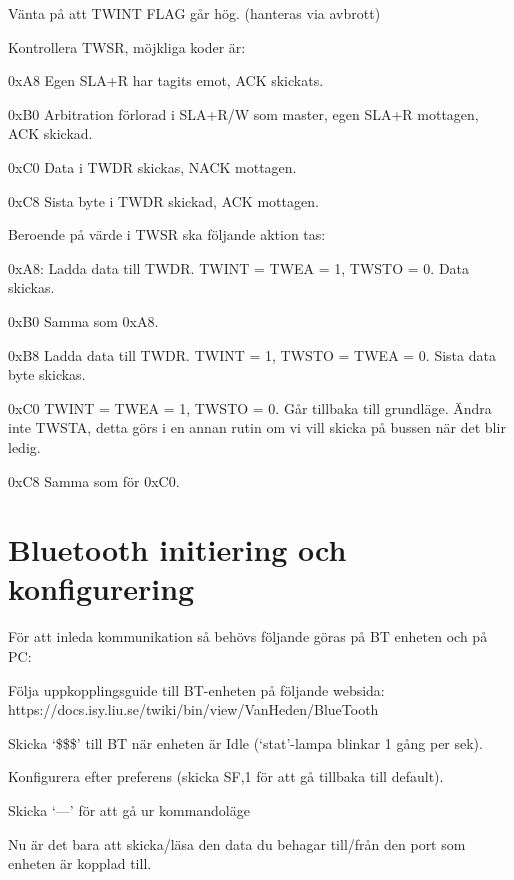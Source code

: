 \begin{packed_enumerate}
\item Vänta på att TWINT FLAG går hög. (hanteras via avbrott)
\item Kontrollera TWSR, möjkliga koder är:
\begin{packed_enumerate}
\item 0xA8 Egen SLA+R har tagits emot, ACK skickats.
\item 0xB0 Arbitration förlorad i SLA+R/W som master, egen SLA+R mottagen, ACK skickad.
\item 0xC0 Data i TWDR skickas, NACK mottagen.
\item 0xC8 Sista byte i TWDR skickad, ACK mottagen.
\end{packed_enumerate}
\item Beroende på värde i TWSR ska följande aktion tas:
\begin{packed_enumerate}
\item 0xA8: Ladda data till TWDR. TWINT = TWEA = 1, TWSTO = 0. Data skickas.
\item 0xB0 Samma som 0xA8.
\item 0xB8 Ladda data till TWDR. TWINT = 1, TWSTO = TWEA = 0. Sista data byte skickas.
\item 0xC0 TWINT = TWEA = 1, TWSTO = 0. Går tillbaka till grundläge. Ändra inte TWSTA, detta görs i en annan rutin om vi vill skicka på bussen när det blir ledig.
\item 0xC8 Samma som för 0xC0.
\end{packed_enumerate}
\end{packed_enumerate}


\section{Bluetooth initiering och konfigurering}
\label{Bluetoothinit}

För att inleda kommunikation så behövs följande göras på BT enheten och på PC:

\begin{packed_enumerate}
\item Följa uppkopplingsguide till BT-enheten på följande websida:
https://docs.isy.liu.se/twiki/bin/view/VanHeden/BlueTooth
\item Skicka ‘\$\$\$’ till BT när enheten är Idle (‘stat’-lampa blinkar 1 gång per sek).
\item Konfigurera efter preferens (skicka SF,1 för att gå tillbaka till default).
\item Skicka ‘---’ för att gå ur kommandoläge
\item Nu är det bara att skicka/läsa den data du behagar till/från den port som enheten är kopplad till.
\end{packed_enumerate}


